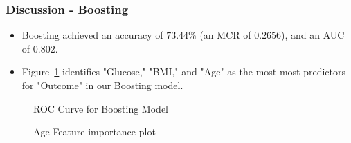 \documentclass{beamer}
\begin{document}
\begin{frame}
    \frametitle{Discussion - Boosting}
    \begin{itemize}
        \item Boosting achieved an accuracy of $73.44\%$ (an MCR of $0.2656$), and an AUC of $0.802$. 
        \item Figure~\ref{fig:importance} identifies "Glucose," "BMI," and "Age" as the most most predictors for "Outcome" in our Boosting model.
    \end{itemize}
    \begin{figure}[h!]
        \centering
        \begin{minipage}{0.48\textwidth}
            \caption{ROC Curve for Boosting Model} 
            \label{fig:ROC curve}
        \end{minipage}
        \hfill %
        \centering
        \begin{minipage}{0.48\textwidth}
            \centering
            \caption{Age Feature importance plot} 
            \label{fig:importance}
        \end{minipage}
    \end{figure}
\end{frame}
   
\end{document}
